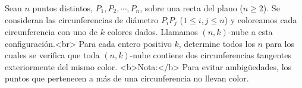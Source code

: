 Sean $n$ puntos distintos, $P_1, P_2, \cdots , P_n$, sobre una recta del plano ($n \geq 2$). Se consideran las circunferencias de diámetro $P_i P_j$ ($1 \leq i,j \leq n$) y coloreamos cada circunferencia con uno de $k$ colores dados. Llamamos $(n,k)$-nube a esta configuración.<br>
Para cada entero positivo $k$, determine todos los $n$ para los cuales se verifica que toda $(n,k)$-nube contiene dos circunferencias tangentes exteriormente del mismo color.
<b>Nota:</b> Para evitar ambigüedades, los puntos que pertenecen a más de una circunferencia no llevan color.
